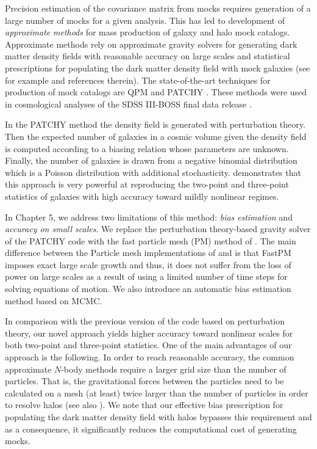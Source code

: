 Precision estimation of the covariance matrix from mocks requires generation of a large number of mocks for a given analysis. This has led to development of \emph{approximate} \emph{methods} for mass production of galaxy and halo mock catalogs. Approximate methods rely on approximate gravity solvers for generating dark matter density fields with reasonable accuracy on large scales and statistical prescriptions for populating the dark matter density field with mock galaxies (see for example \citealt{pthalo,qpm,eazymock,kitaura2016} and references 
therein). The state-of-the-art techniques for production of mock catalogs are QPM \citep{qpm} and PATCHY \citep{kitaura2016}. These methods were used in 
cosmological analyses of the SDSS III-BOSS final data release \citep{alam2016}.

In the PATCHY method the density field is generated with perturbation theory. Then the expected number of galaxies in a cosmic volume given the density field is computed according to a biasing relation whose parameters are unknown. 
Finally, the number of galaxies is drawn from a negative binomial distribution which is a Poisson distribution with additional stochasticity. 
\citet{chuang2015} demonstrates that this approach is very powerful at reproducing the two-point and three-point statistics of galaxies with high accuracy toward mildly nonlinear regimes.

In Chapter 5, we address two limitations of this method: \emph{bias} \emph{estimation} and \emph{accuracy on small scales}. We replace the perturbation theory-based 
gravity solver of the PATCHY code with the fast particle mesh (PM) method of \citet{fastpm}. The main difference between the Particle mesh implementations of \citet{fastpm} and \citet{qpm} is that 
FastPM imposes exact large scale growth and thus, it does not suffer from the loss of power on large scales as a result of using a limited number of time steps for solving equations of motion. We also introduce an automatic bias estimation method based on MCMC. 

In comparison with the previous version of the code based on perturbation theory, our novel approach yields higher accuracy toward nonlinear scales for both two-point 
and three-point statistics. One of the main advantages of our approach is the following. In order to reach reasonable accuracy, the common approximate $N$-body methods \citep{qpm,fastpm,ice_cola} require a larger grid size than the number of particles. That is, the gravitational forces between the particles need to be calculated on a mesh (at least) twice larger than the number of particles in order to resolve halos (see also \citealt{chuang2015,monaco2016}). We note that our effective bias prescription for populating the dark matter density field with halos bypasses this requirement and as a consequence, it significantly reduces the computational cost of generating mocks.      

